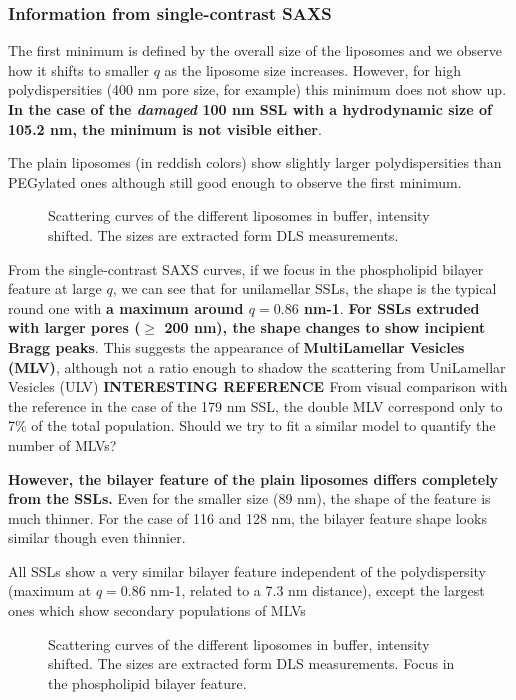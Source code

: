 \subsubsection{Information from single-contrast SAXS}

The first minimum is defined by the overall size of the liposomes and we observe how it shifts to smaller $q$ as the liposome size increases. However, for high polydispersities (400 nm pore size, for example) this minimum does not show up. \textbf{In the case of the \emph{damaged} 100 nm SSL with a hydrodynamic size of 105.2 nm, the minimum is not visible either}.

The plain liposomes (in reddish colors) show slightly larger polydispersities than PEGylated ones although still good enough to observe the first minimum. 


\begin{figure}
	\centering
		
		\caption{Scattering curves of the different liposomes in buffer, intensity shifted. The sizes are extracted form DLS measurements.}
		\label{fig:SSLSingleContrast}
\end{figure}

From the single-contrast SAXS curves, if we focus in the phospholipid bilayer feature at large $q$, we can see that for unilamellar SSLs, the shape is the typical round one with \textbf{a maximum around $q=0.86$ nm-1}. \textbf{For SSLs extruded with larger pores ($\geq$ 200 nm), the shape changes to show incipient Bragg peaks}. This suggests the appearance of \textbf{MultiLamellar Vesicles (MLV)}, although not a ratio enough to shadow the scattering from UniLamellar Vesicles (ULV) \textbf{INTERESTING REFERENCE \cite{sakuragi_transformation_2011}} From visual comparison with the reference in the case of the 179 nm SSL, the double MLV correspond only to 7$\%$ of the total population. Should we try to fit a similar model to quantify the number of MLVs?

\textbf{However, the bilayer feature of the plain liposomes differs completely from the SSLs.} Even for the smaller size (89 nm), the shape of the feature is much thinner. For the case of 116 and 128 nm, the bilayer feature shape looks similar though even thinnier.

All SSLs show a very similar bilayer feature independent of the polydispersity (maximum at $q=0.86$ nm-1, related to a 7.3 nm distance), except the largest ones which show secondary populations of MLVs

\begin{figure}
	\centering
		
		\caption{Scattering curves of the different liposomes in buffer, intensity shifted. The sizes are extracted form DLS measurements. Focus in the phospholipid bilayer feature.}
		\label{fig:SSLSingleContrastBilayer}
\end{figure}

